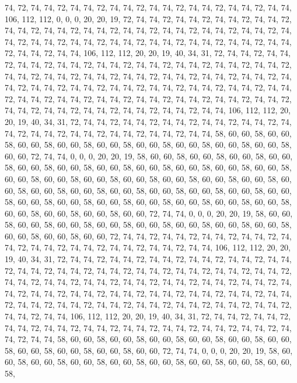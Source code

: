 74, 72, 74, 74, 72, 74, 74, 72, 74, 74, 72, 74, 74, 72, 74, 74, 72, 74, 74, 72, 74, 74, 106, 112, 112, 0, 0, 0, 20, 20, 19, 72, 74, 74, 72, 74, 74, 72, 74, 74, 72, 74, 74, 72, 74, 74, 72, 74, 74, 72, 74, 74, 72, 74, 74, 72, 74, 74, 72, 74, 74, 72, 74, 74,
72, 74, 74, 72, 74, 74, 72, 74, 74, 72, 74, 74, 72, 74, 74, 72, 74, 74, 72, 74, 74, 72, 74, 74, 72, 74, 74, 72, 74, 74, 106, 112, 112, 20, 20, 19, 40, 34, 31, 72, 74, 74, 72, 74, 74, 72, 74, 74, 72, 74, 74, 72, 74, 74, 72, 74, 74, 72, 74, 74, 72, 74, 74, 72,
74, 74, 72, 74, 74, 72, 74, 74, 72, 74, 74, 72, 74, 74, 72, 74, 74, 72, 74, 74, 72, 74, 74, 72, 74, 74, 72, 74, 74, 72, 74, 74, 72, 74, 74, 72, 74, 74, 72, 74, 74, 72, 74, 74, 72, 74, 74, 72, 74, 74, 72, 74, 74, 72, 74, 74, 72, 74, 74, 72, 74, 74, 72, 74,
74, 72, 74, 74, 72, 74, 74, 72, 74, 74, 72, 74, 74, 72, 74, 74, 72, 74, 74, 72, 74, 74, 106, 112, 112, 20, 20, 19, 40, 34, 31, 72, 74, 74, 72, 74, 74, 72, 74, 74, 72, 74, 74, 72, 74, 74, 72, 74, 74, 72, 74, 74, 72, 74, 74, 72, 74, 74, 72, 74, 74, 72, 74, 74,
58, 60, 60, 58, 60, 60, 58, 60, 60, 58, 60, 60, 58, 60, 60, 58, 60, 60, 58, 60, 60, 58, 60, 60, 58, 60, 60, 58, 60, 60, 72, 74, 74, 0, 0, 0, 20, 20, 19, 58, 60, 60, 58, 60, 60, 58, 60, 60, 58, 60, 60, 58, 60, 60, 58, 60, 60, 58, 60, 60, 58, 60, 60, 58,
60, 60, 58, 60, 60, 58, 60, 60, 58, 60, 60, 58, 60, 60, 58, 60, 60, 58, 60, 60, 58, 60, 60, 58, 60, 60, 58, 60, 60, 58, 60, 60, 58, 60, 60, 58, 60, 60, 58, 60, 60, 58, 60, 60, 58, 60, 60, 58, 60, 60, 58, 60, 60, 58, 60, 60, 58, 60, 60, 58, 60, 60, 58, 60,
60, 58, 60, 60, 58, 60, 60, 58, 60, 60, 58, 60, 60, 58, 60, 60, 58, 60, 60, 58, 60, 60, 72, 74, 74, 0, 0, 0, 20, 20, 19, 58, 60, 60, 58, 60, 60, 58, 60, 60, 58, 60, 60, 58, 60, 60, 58, 60, 60, 58, 60, 60, 58, 60, 60, 58, 60, 60, 58, 60, 60, 58, 60, 60,
72, 74, 74, 72, 74, 74, 72, 74, 74, 72, 74, 74, 72, 74, 74, 72, 74, 74, 72, 74, 74, 72, 74, 74, 72, 74, 74, 72, 74, 74, 106, 112, 112, 20, 20, 19, 40, 34, 31, 72, 74, 74, 72, 74, 74, 72, 74, 74, 72, 74, 74, 72, 74, 74, 72, 74, 74, 72, 74, 74, 72, 74, 74, 72,
74, 74, 72, 74, 74, 72, 74, 74, 72, 74, 74, 72, 74, 74, 72, 74, 74, 72, 74, 74, 72, 74, 74, 72, 74, 74, 72, 74, 74, 72, 74, 74, 72, 74, 74, 72, 74, 74, 72, 74, 74, 72, 74, 74, 72, 74, 74, 72, 74, 74, 72, 74, 74, 72, 74, 74, 72, 74, 74, 72, 74, 74, 72, 74,
74, 72, 74, 74, 72, 74, 74, 72, 74, 74, 72, 74, 74, 72, 74, 74, 72, 74, 74, 72, 74, 74, 106, 112, 112, 20, 20, 19, 40, 34, 31, 72, 74, 74, 72, 74, 74, 72, 74, 74, 72, 74, 74, 72, 74, 74, 72, 74, 74, 72, 74, 74, 72, 74, 74, 72, 74, 74, 72, 74, 74, 72, 74, 74,
58, 60, 60, 58, 60, 60, 58, 60, 60, 58, 60, 60, 58, 60, 60, 58, 60, 60, 58, 60, 60, 58, 60, 60, 58, 60, 60, 58, 60, 60, 72, 74, 74, 0, 0, 0, 20, 20, 19, 58, 60, 60, 58, 60, 60, 58, 60, 60, 58, 60, 60, 58, 60, 60, 58, 60, 60, 58, 60, 60, 58, 60, 60, 58,
